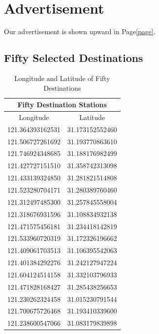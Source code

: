 \documentclass{mcmthesis}
\begin{document}
\newpage\label{page}


\section{Advertisement}\label{sec:adve}
Our advertisement is shown upward in Page\ref{page}.




\newpage
\begin{appendices}
\section{Fifty Selected Destinations}
\begin{table}[htbp]
  \centering
  \caption{Longitude and Latitude of Fifty Destinations}
  \renewcommand\arraystretch{1.35}
    \begin{tabular}{|c|c|}
    \multicolumn{2}{c}{Fifty Destination Stations} \\
    \hline
    Longitude & Latitude \\
    \hline
    121.364393162531  & 31.173152552460  \\
    121.506727261692  & 31.193770863610  \\
    121.746924348685  & 31.188176982499  \\
    121.427727151510  & 31.358742313098  \\
    121.433139324850  & 31.281821514808  \\
    121.523280704171  & 31.280389760460  \\
    121.312497485300  & 31.257845558004  \\
    121.318676931596  & 31.108834932138  \\
    121.471575456181  & 31.234418142819  \\
    121.533960720319  & 31.172326196662  \\
    121.409061703513  & 31.106395542063  \\
    121.401384292276  & 31.242127947224  \\
    121.604124514158  & 31.332103796933  \\
    121.471828168427  & 31.285438256653  \\
    121.230262324458  & 31.015230791544  \\
    121.700675726468  & 31.193410339600  \\
    121.238600547066  & 31.083179839898  \\

\end{tabular}
\end{table}
\end{appendices}
\end{document}
